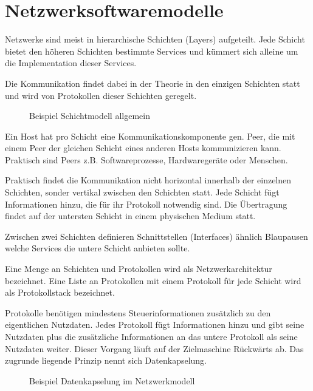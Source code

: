\section{Netzwerksoftwaremodelle}

Netzwerke sind meist in hierarchische Schichten (Layers) aufgeteilt. Jede Schicht bietet den höheren Schichten bestimmte Services und kümmert sich alleine um die Implementation dieser Services.

Die Kommunikation findet dabei in der Theorie in den einzigen Schichten statt und wird von Protokollen dieser Schichten geregelt.

\begin{figure}[H]
    \centering
    
    \caption{Beispiel Schichtmodell allgemein}
    \label{fig:schichtmodell}
\end{figure}
\FloatBarrier

Ein Host hat pro Schicht eine Kommunikationskomponente gen. Peer, die mit einem Peer der gleichen Schicht eines anderen Hosts kommunizieren kann. Praktisch sind Peers z.B. Softwareprozesse, Hardwaregeräte oder Menschen.

Praktisch findet die Kommunikation nicht horizontal innerhalb der einzelnen Schichten, sonder vertikal zwischen den Schichten statt. Jede Schicht fügt Informationen hinzu, die für ihr Protokoll notwendig sind. Die Übertragung findet auf der untersten Schicht in einem physischen Medium statt.

Zwischen zwei Schichten definieren Schnittstellen (Interfaces) ähnlich Blaupausen welche Services die untere Schicht anbieten sollte.

Eine Menge an Schichten und Protokollen wird als Netzwerkarchitektur bezeichnet. Eine Liste an Protokollen mit einem Protokoll für jede Schicht wird als Protokollstack bezeichnet.

Protokolle benötigen mindestens Steuerinformationen zusätzlich zu den eigentlichen Nutzdaten. Jedes Protokoll fügt Informationen hinzu und gibt seine Nutzdaten plus die zusätzliche Informationen an das untere Protokoll als seine Nutzdaten weiter. Dieser Vorgang läuft auf der Zielmaschine Rückwärts ab. Das zugrunde liegende Prinzip nennt sich Datenkapselung.

\begin{figure}[H]
    \centering
    
    \caption{Beispiel Datenkapselung im Netzwerkmodell}
    \label{fig:Datenkapselung}
\end{figure}
\FloatBarrier

